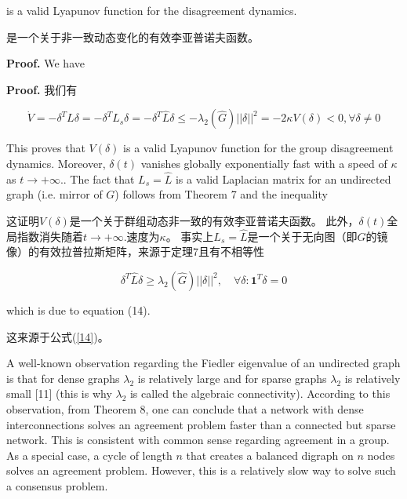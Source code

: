 \documentclass{article}
\begin{document}
{\color[gray]{0.5}
is a valid Lyapunov function for the disagreement dynamics.
}

是一个关于非一致动态变化的有效李亚普诺夫函数。

{\color[gray]{0.5}
\noindent\textbf{Proof.} We have
}

\noindent\textbf{Proof.} 我们有

\begin{equation}
    \tag{29}
    \label{29}
    \dot{V} = -\delta^TL\delta = -\delta^TL_s\delta = -\delta^T\hat{L}\delta \le -\lambda_2(\hat{G})||\delta||^2 = -2\kappa V(\delta) < 0, \forall \delta \ne 0
\end{equation}

{\color[gray]{0.5}
\noindent This proves that $V(\delta)$ is a valid Lyapunov function for the group disagreement dynamics. 
Moreover, $\delta(t)$ vanishes globally exponentially fast with a speed of $\kappa$ as $t\rightarrow +\infty ..$ 
The fact that $L_s = \hat{L}$ is a valid Laplacian matrix for an undirected graph (i.e. mirror of $G$) follows from Theorem 7 and the inequality
}

\noindent 这证明$V(\delta)$是一个关于群组动态非一致的有效李亚普诺夫函数。
此外，$\delta(t)$全局指数消失随着$t\rightarrow +\infty .$速度为$\kappa$。
事实上$L_s = \hat{L}$是一个关于无向图（即$G$的镜像）的有效拉普拉斯矩阵，来源于定理7且有不相等性

\begin{equation}
    \tag{30}
    \label{30}
    \delta^T \hat{L} \delta \ge \lambda_2(\hat{G})||\delta||^2,\quad \forall\delta:\mathbf{1}^T\delta=0
\end{equation}

{\color[gray]{0.5}
\noindent which is due to equation (14).
}

\noindent 这来源于公式(\ref{14})。

{\color[gray]{0.5}
A well-known observation regarding the Fiedler eigenvalue of an undirected graph is that for dense graphs $\lambda_2$ is relatively large and for sparse graphs $\lambda_2$ is relatively small [11] (this is why $\lambda_2$ is called the algebraic connectivity). 
According to this observation, from Theorem 8, one can conclude that a network with dense interconnections solves an agreement problem faster than a connected but sparse network. 
This is consistent with common sense regarding agreement in a group. 
As a special case, {\color{green}a cycle of length $n$ that creates a balanced digraph on $n$ nodes solves an agreement problem.} 
However, this is a relatively slow way to solve such a consensus problem.
}
\end{document}
